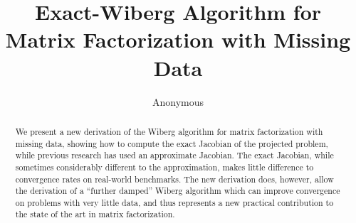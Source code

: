 \documentclass[runningheads]{llncs}
\begin{document}
\pagestyle{headings}
\mainmatter
\def \ECCV12SubNumber{1348}  %

\title{Exact-Wiberg Algorithm for Matrix Factorization with Missing Data} %



\author{Anonymous}
\institute{Paper ID \ECCV12SubNumber}


\maketitle

\begin{abstract}
We present a new derivation of the Wiberg algorithm for matrix factorization with missing data, showing how to compute the exact Jacobian of the projected problem, while previous research has used an approximate Jacobian.   The exact Jacobian, while sometimes considerably different to the approximation, makes little difference to convergence rates on real-world benchmarks.   The new derivation does, however, allow the derivation of a ``further damped'' Wiberg algorithm which can improve convergence on problems with very little data, and thus represents a new practical contribution to the state of the art in matrix factorization.
\end{abstract}
\end{document}
